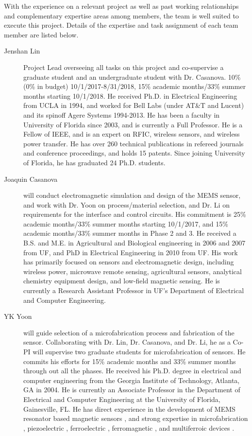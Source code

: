 With the experience on a relevant project as well as past working relationships and complementary expertise areas among members, the team is well suited to execute this project. Details of the expertise and task assignment of each team member are listed below. 

\begin{description}
  \item[Jenshan Lin] Project Lead overseeing all tasks on this project and co-supervise a graduate student and an undergraduate student with Dr. Casanova. 10\% (0\% in budget) 10/1/2017-8/31/2018, 15\% academic months/33\% summer months starting 10/1/2018. He received Ph.D. in Electrical Engineering from UCLA in 1994, and worked for Bell Labs (under AT\&T and Lucent) and its spinoff Agere Systems 1994-2013. He has been a faculty in University of Florida since 2003, and is currently a Full Professor. He is a Fellow of IEEE, and is an expert on RFIC, wireless sensors, and wireless power transfer. He has over 260 technical publications in refereed journals and conference proceedings, and holds 15 patents. Since joining University of Florida, he has graduated 24 Ph.D. students.
  \item[Joaquin Casanova] will conduct electromagnetic simulation and design of the MEMS sensor, and work with Dr. Yoon on process/material selection, and Dr. Li on requirements for the interface and control circuits. His commitment is 25\% academic months/33\% summer months starting 10/1/2017, and 15\% academic months/33\% summer months in Phase 2 and 3. He received a B.S. and M.E. in Agricultural and Biological engineering in 2006 and 2007 from UF, and PhD in Electrical Engineering in 2010 from UF. His work has primarily focused on sensors and electromagnetic design, including wireless power, microwave remote sensing, agricultural sensors, analytical chemistry equipment design, and low-field magnetic sensing. He is currently a Research Assistant Professor in UF's Department of Electrical and Computer Engineering. 
  \item[YK Yoon] will guide selection of a microfabrication process and fabrication of the sensor. Collaborating with Dr. Lin, Dr. Casanova, and Dr. Li, he as a Co-PI will supervise two graduate students for microfabrication of sensors. He commits his efforts for 15\% academic months and 33\% summer months through out all the phases. He received his Ph.D. degree in electrical and computer engineering from the Georgia Institute of Technology, Atlanta, GA in 2004. He is currently an Associate Professor in the Department of Electrical and Computer Engineering at the University of Florida, Gainesville, FL. He has direct experience in the development of MEMS resonator based magnetic sensors \cite{choi2006magnetically, choi2006magnetically2, choi2011nonlinear}, and strong expertise in microfabrication \cite{yoon2006multidirectional}, piezoelectric \cite{wulateral}, ferroelectric \cite{kim2014microwave,yoon2005low,yoon2003reduced}, ferromagnetic \cite{rahimi2016study,rahimi2015cylindrical,yoon2013multi}, and multiferroic devices \cite{yoon2013multi,kim2014room}.


\end{description}
